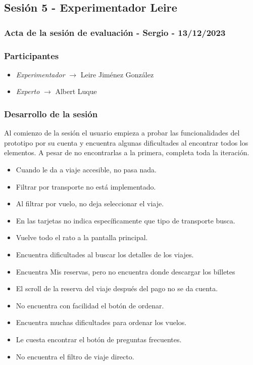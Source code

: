 \subsection{Sesión 5 - Experimentador Leire}
\subsubsection{Acta de la sesión de evaluación - Sergio - 13/12/2023}
\subsubsection{Participantes}
\begin{itemize}
    \item \textit{Experimentador} $\rightarrow$ Leire Jiménez González
    \item \textit{Experto} $\rightarrow$ Albert Luque
\end{itemize}

\subsubsection{Desarrollo de la sesión}
Al comienzo de la sesión el usuario empieza a probar las funcionalidades del prototipo por su cuenta y encuentra algunas dificultades al encontrar todos los elementos. 
A pesar de no encontrarlas a la primera, completa toda la iteración.
\begin{itemize}
    \item Cuando le da a viaje accesible, no pasa nada.
    \item Filtrar por transporte no está implementado.
    \item Al filtrar por vuelo, no deja seleccionar el viaje.
    \item En las tarjetas no indica específicamente que tipo de transporte busca.
    \item Vuelve todo el rato a la pantalla principal.
    \item Encuentra dificultades al buscar los detalles de los viajes.
    \item Encuentra Mis reservas, pero no encuentra donde descargar los billetes
    \item El scroll de la reserva del viaje después del pago no se da cuenta.
    \item No encuentra con facilidad el botón de ordenar.
    \item Encuentra muchas dificultades para ordenar los vuelos.
    \item Le cuesta encontrar el botón de preguntas frecuentes.
    \item No encuentra el filtro de viaje directo.
\end{itemize}

